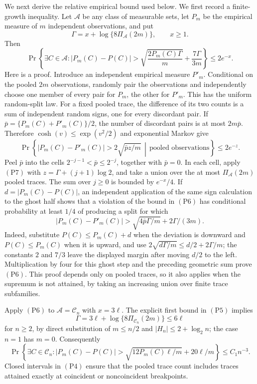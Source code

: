 We next derive the relative empirical bound used below.  We first record a
finite-growth inequality.  Let \(\mathcal A\) be any class of measurable sets,
let \(P_m\) be the empirical measure of \(m\) independent observations, and
put
\[
 \Gamma=x+\log\{8\Pi_{\mathcal A}(2m)\},\qquad x\geq1.
\]
Then
\[
 \Pr\!\left\{\exists C\in\mathcal A:
 |P_m(C)-P(C)|>
 \sqrt{\frac{2P_m(C)\Gamma}{m}}+\frac{7\Gamma}{3m}\right\}
 \leq2e^{-x}.                                                       \tag{P6}
\]
Here is a proof.  Introduce an independent empirical measure \(P'_m\).
Conditional on the pooled \(2m\) observations, randomly pair the observations
and independently choose one member of every pair for \(P_m\), the other for
\(P'_m\).  This has the uniform random-split law.  For a fixed pooled trace,
the difference of its two counts is a sum of independent random signs, one
for every discordant pair.  If
\(\bar p=\{P_m(C)+P'_m(C)\}/2\), the number of discordant pairs is at most
\(2m\bar p\).  Therefore \(\cosh(v)\leq\exp(v^2/2)\) and exponential Markov
give
\[
 \Pr\!\left\{|P_m(C)-P'_m(C)|>
 2\sqrt{\bar p z/m}\,\middle|\,\text{pooled observations}\right\}
 \leq2e^{-z}.                                                       \tag{P7}
\]
Peel \(\bar p\) into the cells
\(2^{-j-1}<\bar p\leq2^{-j}\), together with \(\bar p=0\).  In each cell,
apply \((\mathrm{P7})\) with
\(z=\Gamma+(j+1)\log2\), and take a union over the at most
\(\Pi_{\mathcal A}(2m)\) pooled traces.  The sum over \(j\geq0\) is bounded
by \(e^{-x}/4\).  If \(d=|P_m(C)-P(C)|\), an independent application of the
same sign calculation to the ghost half shows that a violation of the bound
in \((\mathrm{P6})\) has conditional probability at least \(1/4\) of
producing a split for which
\[
 |P_m(C)-P'_m(C)|>
 \sqrt{4\bar p\Gamma/m}+2\Gamma/(3m).
\]
Indeed, substitute \(P(C)\leq P_m(C)+d\) when the deviation is downward and
\(P(C)\leq P_m(C)\) when it is upward, and use
\(2\sqrt{d\Gamma/m}\leq d/2+2\Gamma/m\); the constants
\(2\) and \(7/3\) leave the displayed margin after moving \(d/2\) to the
left.  Multiplication by four for this ghost step and the preceding geometric
sum prove \((\mathrm{P6})\).  This proof depends only on pooled traces, so it
also applies when the supremum is not attained, by taking an increasing union
over finite trace subfamilies.

Apply \((\mathrm{P6})\) to \(\mathcal A=\mathcal C_n\) with \(x=3\ell\).
The explicit first bound in \((\mathrm{P5})\) implies
\[
 \Gamma=3\ell+\log\{8\Pi_{\mathcal C_n}(2m)\}\leq6\ell
\]
for \(n\geq2\), by direct substitution of \(m\leq n/2\) and
\(|H_n|\leq2+\log_2n\); the case \(n=1\) has \(m=0\).  Consequently
\[
 \Pr\!\left\{\exists C\in\mathcal C_n:
 |P_m(C)-P(C)|>
 \sqrt{12P_m(C)\ell/m}+20\ell/m\right\}
 \leq C_1n^{-3}.                                                     \tag{P8}
\]
Closed intervals in \((\mathrm{P4})\) ensure that the pooled trace count
includes traces attained exactly at coincident or noncoincident breakpoints.

